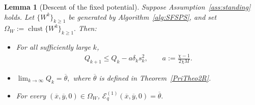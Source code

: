 \documentclass[9pt]{article}
\numberwithin{equation}{section}
\newtheorem{lemma}[theorem]{Lemma}
\theoremstyle{definition}
\theoremstyle{remark}
\newcommand{\Ecal}{\mathcal E}
\DeclareMathOperator{\clust}{clust}
\begin{document}
\begin{lemma}[Descent of the fixed potential]\label{lem:fixed-descent}
Suppose Assumption~\ref{ass:standing} holds. Let
$\{W^k\}_{k\geq1}$ be generated by Algorithm~\ref{alg:SFSPS}, and set
$
 \Omega_W:=\clust\{W^k\}_{k\geq1}.$
Then:
\begin{itemize}
\item[(i)] For all sufficiently large $k$,
\begin{eqnarray}\label{eq:Q-descent1}
 Q_{k+1}\leq Q_k-a\delta_ks_k^2,
 \qquad a:=\frac{\chi-1}{2\chi M}.
\end{eqnarray}
\item[(ii)]
$
 \lim_{k\to\infty}Q_k=\overline\theta,$
where $\overline\theta$ is defined in Theorem~\ref{PriTheo2R}.
\item[(iii)] For every
$(\overline x,\overline y,0)\in\Omega_W$,
$
 \Ecal_q^{(1)}(\overline x,\overline y,0)=\overline\theta.
$
\end{itemize}
\end{lemma}
\end{document}
